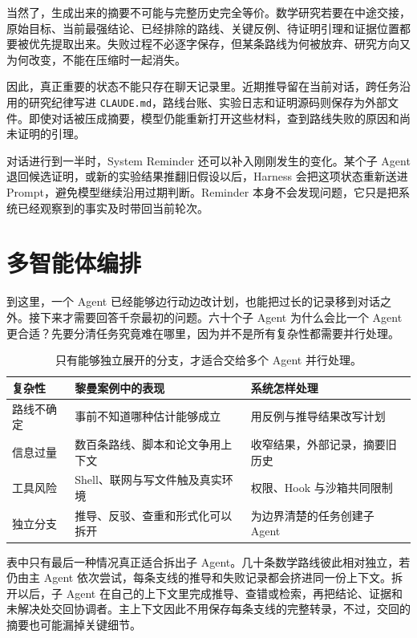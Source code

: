 当然了，生成出来的摘要不可能与完整历史完全等价。数学研究若要在中途交接，原始目标、当前最强结论、已经排除的路线、关键反例、待证明引理和证据位置都要被优先提取出来。失败过程不必逐字保存，但某条路线为何被放弃、研究方向又为何改变，不能在压缩时一起消失。

因此，真正重要的状态不能只存在聊天记录里。近期推导留在当前对话，跨任务沿用的研究纪律写进 \texttt{CLAUDE.md}，路线台账、实验日志和证明源码则保存为外部文件。即使对话被压成摘要，模型仍能重新打开这些材料，查到路线失败的原因和尚未证明的引理。\cite{ch03inside}

对话进行到一半时，System Reminder 还可以补入刚刚发生的变化。某个子 Agent 退回候选证明，或新的实验结果推翻旧假设以后，Harness 会把这项状态重新送进 Prompt，避免模型继续沿用过期判断。Reminder 本身不会发现问题，它只是把系统已经观察到的事实及时带回当前轮次。\cite{ch03inside}

\FloatBarrier

\section{多智能体编排}

到这里，一个 Agent 已经能够边行动边改计划，也能把过长的记录移到对话之外。接下来才需要回答千奈最初的问题。六十个子 Agent 为什么会比一个 Agent 更合适？先要分清任务究竟难在哪里，因为并不是所有复杂性都需要并行处理。

\begin{table}[htbp]
\centering
\small
\setlength{\tabcolsep}{5pt}
\begin{tabular}{L{0.20\textwidth}L{0.34\textwidth}L{0.36\textwidth}}
\toprule
复杂性 & 黎曼案例中的表现 & 系统怎样处理 \\
\midrule
路线不确定 & 事前不知道哪种估计能够成立 & 用反例与推导结果改写计划 \\
信息过量 & 数百条路线、脚本和论文争用上下文 & 收窄结果，外部记录，摘要旧历史 \\
工具风险 & Shell、联网与写文件触及真实环境 & 权限、Hook 与沙箱共同限制 \\
独立分支 & 推导、反驳、查重和形式化可以拆开 & 为边界清楚的任务创建子 Agent \\
\bottomrule
\end{tabular}
\caption{只有能够独立展开的分支，才适合交给多个 Agent 并行处理。}
\label{tab:ch03-complexity}
\end{table}

表中只有最后一种情况真正适合拆出子 Agent。几十条数学路线彼此相对独立，若仍由主 Agent 依次尝试，每条支线的推导和失败记录都会挤进同一份上下文。拆开以后，子 Agent 在自己的上下文里完成推导、查错或检索，再把结论、证据和未解决处交回协调者。主上下文因此不用保存每条支线的完整转录，不过，交回的摘要也可能漏掉关键细节。\cite{ch03officialsubagents}

